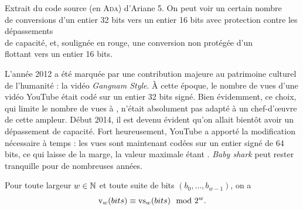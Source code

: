 \documentclass{magnoliaold}
\begin{document}
\begin{remarques}
\begin{center}
    Extrait du code source (en \textsc{Ada}) d'Ariane 5. On peut voir
      un certain nombre\\ de conversions d'un entier 32 bits
      vers un entier 16 bits
      avec protection contre les dépassements\\ de
      capacité, et, soulignée en rouge, une conversion  non protégée d'un\\ flottant vers
      un entier 16 bits.
  \end{center}
  \remarque
    L'année 2012 a été marquée par une contribution majeure au patrimoine
    culturel de l'humanité : la vidéo \emph{Gangnam Style}. À cette
    époque, le nombre de vues d'une vidéo YouTube était codé 
    sur un entier 32 bits signé.
    Bien évidemment, ce choix, qui limite le nombre de vues à
    , n'était absolument pas adapté à un
    chef-d'œuvre de cette ampleur. Début 2014, il est devenu évident
    qu'on allait bientôt avoir un dépassement de capacité. Fort heureusement,
    YouTube a apporté la modification nécessaire à temps : les vues sont
    maintenant codées sur un entier signé de 64 bits, ce qui laisse de la marge, la valeur maximale étant
    . \emph{Baby shark} peut rester
    tranquille pour de nombreuses années.
  \end{remarques}

\begin{proposition}
  Pour toute largeur $w\in\mathbb{N}$ et toute suite de bits $(b_0, \ldots, b_{w-1})$, on a
  \begin{displaymath}
    {\rm v}_{w}(bits) \equiv {\rm vs}_{w}(bits) \mod{2^{w}}.
  \end{displaymath}
\end{proposition}
\end{document}

